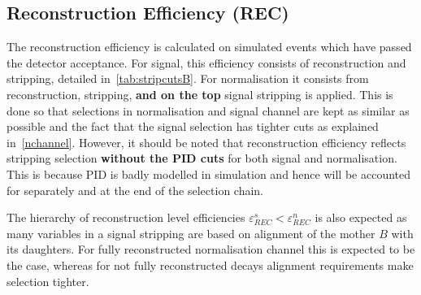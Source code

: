 
\subsection{Reconstruction Efficiency (REC)}
The reconstruction efficiency is calculated on simulated events which have passed the detector acceptance. For signal, this efficiency consists of reconstruction and stripping, detailed in~\autoref{tab:stripcutsB}. For normalisation it consists from reconstruction, stripping, \textbf{and on the top} signal stripping is applied. This is done so that selections in normalisation and signal channel are kept as similar as possible and the fact that the signal selection has tighter cuts as explained in~\autoref{nchannel}. However, it should be noted that reconstruction efficiency reflects stripping selection \textbf{without the PID cuts} for both signal and normalisation. This is because \gls{PID} is badly modelled in simulation and hence will be accounted for separately and at the end of the selection chain.

The hierarchy of reconstruction level efficiencies $\varepsilon^{s}_{REC} < \varepsilon^{n}_{REC}$ is also expected as many variables in a signal stripping are based on alignment of the mother $B$ with its daughters. For fully reconstructed normalisation channel this is expected to be the case, whereas for not fully reconstructed decays alignment requirements make selection tighter. 


